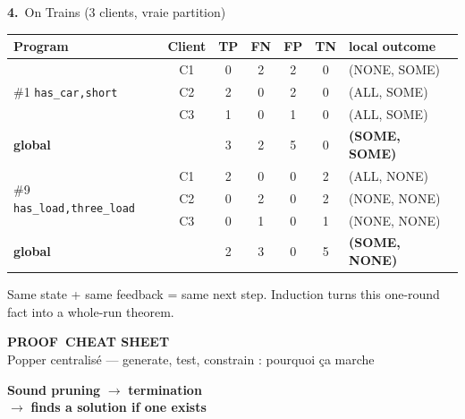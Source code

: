 \documentclass[10pt]{article}
\newcommand{\num}[1]{\textcolor{marine}{\textbf{#1.}}~}
\begin{document}
\vspace{2pt}
\begin{bloc}[fontupper=\scriptsize\raggedright]{\num{4}On Trains (3 clients, vraie partition)}
{\scriptsize
\renewcommand{\arraystretch}{1.1}
\begin{tabular}{@{}l c c c c c l@{}}
\textbf{Program} & \textbf{Client} & TP & FN & FP & TN & \textbf{local outcome}\\\hline
\multirow{3}{*}{\#1 \texttt{has\_car,short}} & C1 & 0 & 2 & 2 & 0 & (NONE, SOME)\\
 & C2 & 2 & 0 & 2 & 0 & (ALL, SOME)\\
 & C3 & 1 & 0 & 1 & 0 & (ALL, SOME)\\
\textbf{global} & & 3 & 2 & 5 & 0 & \textbf{(SOME, SOME)}\\\hline
\multirow{3}{*}{\#9 \texttt{has\_load,three\_load}} & C1 & 2 & 0 & 0 & 2 & (ALL, NONE)\\
 & C2 & 0 & 2 & 0 & 2 & (NONE, NONE)\\
 & C3 & 0 & 1 & 0 & 1 & (NONE, NONE)\\
\textbf{global} & & 2 & 3 & 0 & 5 & \textbf{(SOME, NONE)}\\
\end{tabular}}
\end{bloc}

\vspace{3pt}
\begin{tcolorbox}[colback=marine, colframe=marine, arc=0pt, boxrule=0pt,
  halign=center, top=2pt, bottom=2pt]
\color{white}\scriptsize Same state + same feedback = same next step. Induction turns this one-round fact into a whole-run theorem.
\end{tcolorbox}


\begin{minipage}[c]{0.64\textwidth}
  {\fontsize{26}{28}\selectfont\bfseries\textcolor{marine}{PROOF}~CHEAT SHEET}\\[1pt]
  {\small Popper centralisé --- generate, test, constrain : pourquoi ça marche}
\end{minipage}\hfill
\begin{minipage}[c]{0.34\textwidth}\raggedright
  \normalsize \textbf{Sound pruning} $\to$ \textbf{termination}\\ $\to$ \textbf{finds a solution if one exists}
\end{minipage}
\end{document}
